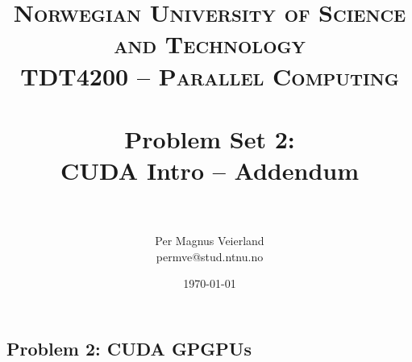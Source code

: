 

\title{	
\normalfont \normalsize 
\textsc{Norwegian University of Science and Technology\\TDT4200 -- Parallel Computing} \\ [25pt]
\horrule{0.5pt} \\[0.4cm]
\huge Problem Set 2:\\ CUDA Intro -- Addendum\\
\horrule{2pt} \\[0.5cm]
}

\author{Per Magnus Veierland\\permve@stud.ntnu.no}


\date{\normalsize\today}


\maketitle

\subsection*{Problem 2: CUDA GPGPUs}

